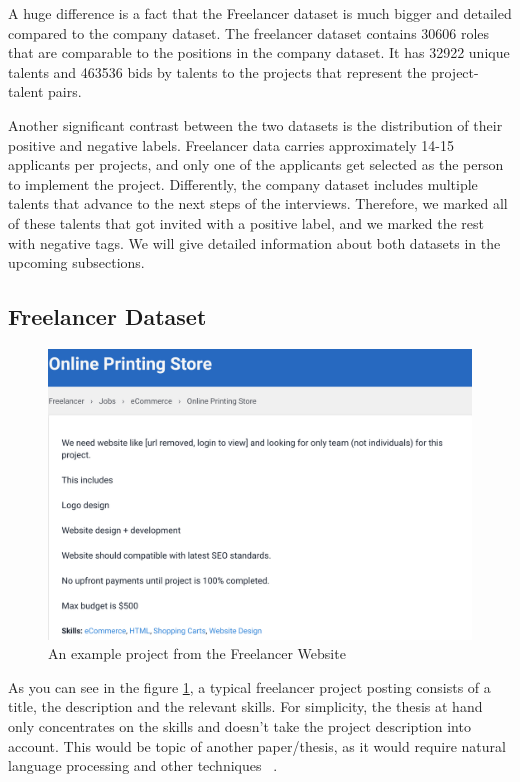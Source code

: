 A huge difference is a fact that the Freelancer dataset is much bigger and detailed compared to the company dataset. The freelancer dataset contains 30606 roles that are comparable to the positions in the company dataset. It has 32922 unique talents and 463536 bids by talents to the projects that represent the project-talent pairs.



Another significant contrast between the two datasets is the distribution of their positive and negative labels. Freelancer data carries approximately 14-15 applicants per projects, and only one of the applicants get selected as the person to implement the project. Differently,  the company dataset includes multiple talents that advance to the next steps of the interviews. Therefore, we marked all of these talents that got invited with a positive label, and we marked the rest with negative tags. We will give detailed information about both datasets in the upcoming subsections.


\subsection{Freelancer Dataset}\label{implementation-subsection-freelancer}


\begin{figure}[htp]
	\centering
	\includegraphics[width=\textwidth]{figures/FreelancerExample.png}
	\caption{An example project from the Freelancer Website}
	\label{fig:freelancer-example-project}
\end{figure}


As you can see in the figure \ref{fig:freelancer-example-project}, a typical freelancer project posting consists of a title, the description and the relevant skills. For simplicity, the thesis at hand only concentrates on the skills and doesn't take the project description into account. This would be topic of another paper/thesis, as it would require natural language processing and other techniques ~\parencite{bird2009natural}.


